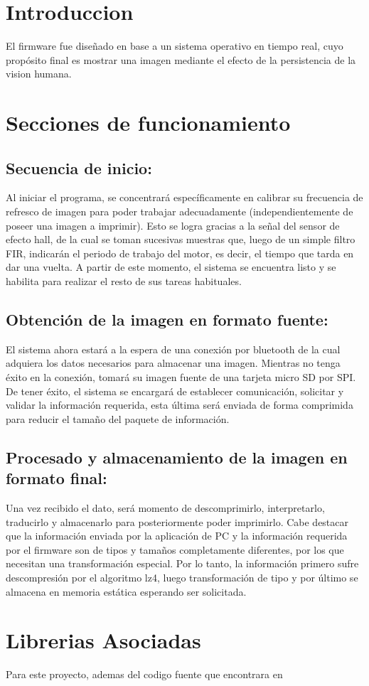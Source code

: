 \hypertarget{index_intro_sec}{}\section{Introduccion}\label{index_intro_sec}
El firmware fue diseñado en base a un sistema operativo en tiempo real, cuyo propósito final es mostrar una imagen mediante el efecto de la persistencia de la vision humana.\hypertarget{index_install_sec}{}\section{Secciones de funcionamiento}\label{index_install_sec}
\hypertarget{index_step1}{}\subsection{Secuencia de inicio\+:}\label{index_step1}
Al iniciar el programa, se concentrará específicamente en calibrar su frecuencia de refresco de imagen para poder trabajar adecuadamente (independientemente de poseer una imagen a imprimir). Esto se logra gracias a la señal del sensor de efecto hall, de la cual se toman sucesivas muestras que, luego de un simple filtro F\+IR, indicarán el periodo de trabajo del motor, es decir, el tiempo que tarda en dar una vuelta. A partir de este momento, el sistema se encuentra listo y se habilita para realizar el resto de sus tareas habituales.\hypertarget{index_step2}{}\subsection{Obtención de la imagen en formato fuente\+:}\label{index_step2}
El sistema ahora estará a la espera de una conexión por bluetooth de la cual adquiera los datos necesarios para almacenar una imagen. Mientras no tenga éxito en la conexión, tomará su imagen fuente de una tarjeta micro SD por S\+PI. De tener éxito, el sistema se encargará de establecer comunicación, solicitar y validar la información requerida, esta última será enviada de forma comprimida para reducir el tamaño del paquete de información.\hypertarget{index_step3}{}\subsection{Procesado y almacenamiento de la imagen en formato final\+:}\label{index_step3}
Una vez recibido el dato, será momento de descomprimirlo, interpretarlo, traducirlo y almacenarlo para posteriormente poder imprimirlo. Cabe destacar que la información enviada por la aplicación de PC y la información requerida por el firmware son de tipos y tamaños completamente diferentes, por los que necesitan una transformación especial. Por lo tanto, la información primero sufre descompresión por el algoritmo lz4, luego transformación de tipo y por último se almacena en memoria estática esperando ser solicitada.\hypertarget{index_lib_sec}{}\section{Librerias Asociadas}\label{index_lib_sec}
Para este proyecto, ademas del codigo fuente que encontrara en

